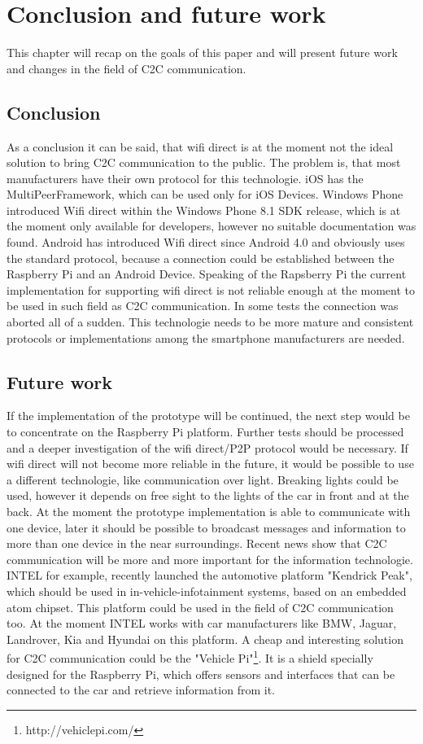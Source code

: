 \chapter{Conclusion and future work}
\label{cha:ConclusionFutureWork}
This chapter will recap on the goals of this paper and will present future work and changes in the field of C2C communication.

\section{Conclusion}
\label{sec:Conclusion}
As a conclusion it can be said, that wifi direct is at the moment not the ideal solution to bring C2C communication to the public. The problem is, that most manufacturers have their own protocol for this technologie. iOS has the MultiPeerFramework, which can be used only for iOS Devices. Windows Phone introduced Wifi direct within the Windows Phone 8.1 SDK release, which is at the moment only available for developers, however no suitable documentation was found. Android has introduced Wifi direct since Android 4.0 and obviously uses the standard protocol, because a connection could be established between the Raspberry Pi and an Android Device. Speaking of the Rapsberry Pi the current implementation for supporting wifi direct is not reliable enough at the moment to be used in such field as C2C communication. In some tests the connection was aborted all of a sudden. This technologie needs to be more mature and consistent protocols or implementations among the smartphone manufacturers are needed.

\section{Future work}
\label{sec:FutureWork}
If the implementation of the prototype will be continued, the next step would be to concentrate on the Raspberry Pi platform. Further tests should be processed and a deeper investigation of the wifi direct/P2P protocol would be necessary. If wifi direct will not become more reliable in the future, it would be possible to use a different technologie, like communication over light. Breaking lights could be used, however it depends on free sight to the lights of the car in front and at the back. At the moment the prototype implementation is able to communicate with one device, later it should be possible to broadcast messages and information to more than one device in the near surroundings. Recent news show that C2C communication will be more and more important for the information technologie. INTEL for example, recently launched the automotive platform "Kendrick Peak", which should be used in in-vehicle-infotainment systems, based on an embedded atom chipset. This platform could be used in the field of C2C communication too. At the moment INTEL works with car manufacturers like BMW, Jaguar, Landrover, Kia and Hyundai on this platform. A cheap and interesting solution for C2C communication could be the "Vehicle Pi"\footnote{http://vehiclepi.com/}. It is a shield specially designed for the Raspberry Pi, which offers sensors and interfaces that can be connected to the car and retrieve information from it. 

